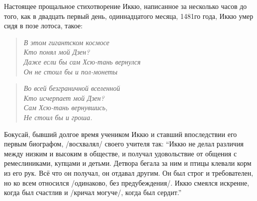 \begin{ver}
Настоящее прощальное стихотворение Иккю, написанное за несколько часов
до того, как в двадцать первый день, одиннадцатого месяца, 1481го
года, Иккю умер сидя в позе лотоса, такое:
\end{ver}

\begin{ver}
  \begin{verse}\it
    В этом гигантском космосе\\
    Кто понял мой Дзен?\\
    Даже если бы сам Хсю-тань вернулся\\
    Он не стоил бы и пол-монеты
  \end{verse}
\end{ver}

\begin{ver}[1]
  \begin{verse}\it
    Во всей безграничной вселенной\\
    Кто исчерпает мой Дзен?\\
    Сам Хсю-тань вернувшись,\\
    Не стоил бы и гроша.
  \end{verse}
\end{ver}

\begin{ver}
  Бокусай, бывший долгое время учеником Иккю и ставший впоследствии его
первым биографом, /восхвалял/ своего учителя так:
``Иккю не делал различия между низким и высоким в обществе, и получал
удовольствие от общения с ремеслиниками, купцами и детьми. Детвора
бегала за ним и птицы клевали корм из его рук. Всё что он получал, он
отдавал другим. Он был строг и требователен, но ко всем относился
/одинаково, без предубеждения/. Иккю смеялся
искренне, когда был счастлив и /кричал могуче/,
когда был сердит.''
\end{ver}

